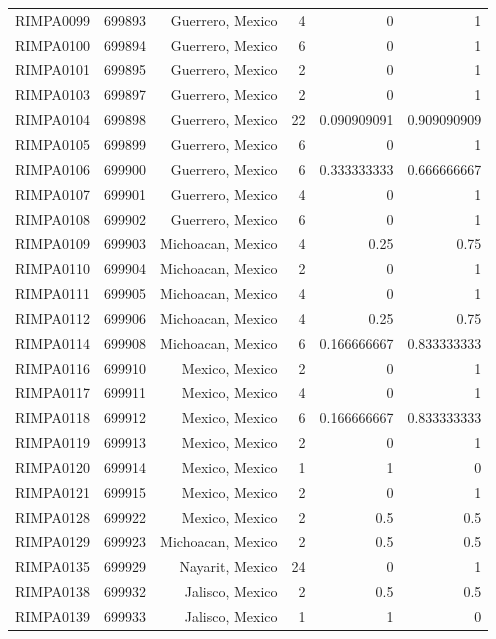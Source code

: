 \documentclass[11pt]{article}
\begin{document}
\begin{linenumbers}
\begin{flushleft}
\begin{table}[htbp]
\begin{tabular}{rrrrrr}
    RIMPA0099 & 699893 & Guerrero, Mexico & 4     & 0     & 1 \\
    RIMPA0100 & 699894 & Guerrero, Mexico & 6     & 0     & 1 \\
    RIMPA0101 & 699895 & Guerrero, Mexico & 2     & 0     & 1 \\
    RIMPA0103 & 699897 & Guerrero, Mexico & 2     & 0     & 1 \\
    RIMPA0104 & 699898 & Guerrero, Mexico & 22    & 0.090909091 & 0.909090909 \\
    RIMPA0105 & 699899 & Guerrero, Mexico & 6     & 0     & 1 \\
    RIMPA0106 & 699900 & Guerrero, Mexico & 6     & 0.333333333 & 0.666666667 \\
    RIMPA0107 & 699901 & Guerrero, Mexico & 4     & 0     & 1 \\
    RIMPA0108 & 699902 & Guerrero, Mexico & 6     & 0     & 1 \\
    RIMPA0109 & 699903 & Michoacan, Mexico & 4     & 0.25  & 0.75 \\
    RIMPA0110 & 699904 & Michoacan, Mexico & 2     & 0     & 1 \\
    RIMPA0111 & 699905 & Michoacan, Mexico & 4     & 0     & 1 \\
    RIMPA0112 & 699906 & Michoacan, Mexico & 4     & 0.25  & 0.75 \\
    RIMPA0114 & 699908 & Michoacan, Mexico & 6     & 0.166666667 & 0.833333333 \\
    RIMPA0116 & 699910 & Mexico, Mexico & 2     & 0     & 1 \\
    RIMPA0117 & 699911 & Mexico, Mexico & 4     & 0     & 1 \\
    RIMPA0118 & 699912 & Mexico, Mexico & 6     & 0.166666667 & 0.833333333 \\
    RIMPA0119 & 699913 & Mexico, Mexico & 2     & 0     & 1 \\
    RIMPA0120 & 699914 & Mexico, Mexico & 1     & 1     & 0 \\
    RIMPA0121 & 699915 & Mexico, Mexico & 2     & 0     & 1 \\
    RIMPA0128 & 699922 & Mexico, Mexico & 2     & 0.5   & 0.5 \\
    RIMPA0129 & 699923 & Michoacan, Mexico & 2     & 0.5   & 0.5 \\
    RIMPA0135 & 699929 & Nayarit, Mexico & 24    & 0     & 1 \\
    RIMPA0138 & 699932 & Jalisco, Mexico & 2     & 0.5   & 0.5 \\
    RIMPA0139 & 699933 & Jalisco, Mexico & 1     & 1     & 0 \\

\end{tabular}
\end{table}
\end{flushleft}
\end{linenumbers}
\end{document}
